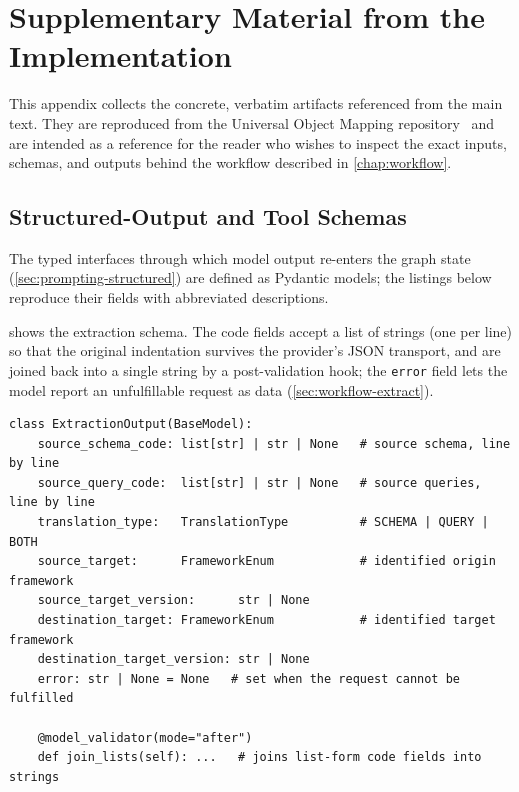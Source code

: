 \chapter{Supplementary Material from the Implementation}
\label{app:implementation}

This appendix collects the concrete, verbatim artifacts referenced from the main
text. They are reproduced from the Universal Object Mapping
repository~\cite{corovcakUOMRepository2026} and are intended as a reference for the
reader who wishes to inspect the exact inputs, schemas, and outputs behind the
workflow described in \cref{chap:workflow}.

\section{Structured-Output and Tool Schemas}
\label{app:pydantic-schemas}

The typed interfaces through which model output re-enters the graph state
(\cref{sec:prompting-structured}) are defined as Pydantic models; the listings below
reproduce their fields with abbreviated descriptions.

 shows the extraction schema. The code fields accept a
list of strings (one per line) so that the original indentation survives the
provider's JSON transport, and are joined back into a single string by a
post-validation hook; the \texttt{error} field lets the model report an unfulfillable
request as data (\cref{sec:workflow-extract}).

\begin{listing}[H]
\begin{verbatim}
class ExtractionOutput(BaseModel):
    source_schema_code: list[str] | str | None   # source schema, line by line
    source_query_code:  list[str] | str | None   # source queries, line by line
    translation_type:   TranslationType          # SCHEMA | QUERY | BOTH
    source_target:      FrameworkEnum            # identified origin framework
    source_target_version:      str | None
    destination_target: FrameworkEnum            # identified target framework
    destination_target_version: str | None
    error: str | None = None   # set when the request cannot be fulfilled

    @model_validator(mode="after")
    def join_lists(self): ...   # joins list-form code fields into strings
\end{verbatim}
\caption{The extraction schema (abridged from \texttt{react\_agent/graph.py}).}
\label{lst:app-extraction}
\end{listing}

